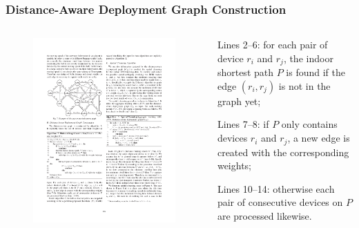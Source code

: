 \begin{frame}
\frametitle{Distance-Aware Deployment Graph Construction}

\begin{columns}[c]

  \begin{figure}[tb]
    \includegraphics[width=\columnwidth]{figures/3-2/3-2-10.pdf}
  \end{figure}

  \begin{sitemize}
    \item Lines 2--6: for each pair of device $r_i$ and $r_j$, the indoor shortest path $P$ is found if the edge $(r_i, r_j)$ is not in the graph yet;
    \item Lines 7--8: if $P$ only contains devices $r_i$ and $r_j$, a new edge is created with the corresponding weights;
    \item Lines 10--14: otherwise each pair of consecutive devices on $P$ are processed likewise.
  \end{sitemize}

\end{columns}

\end{frame}

